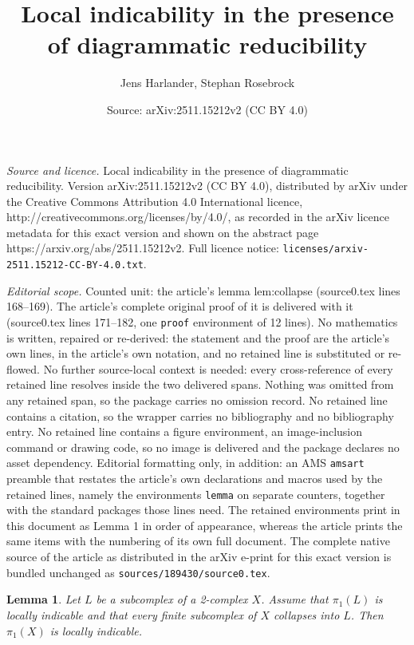 \documentclass[10pt,a4paper]{amsart}
\title{Local indicability in the presence of diagrammatic reducibility}
\author{Jens Harlander, Stephan Rosebrock}
\date{Source: arXiv:2511.15212v2 (CC BY 4.0)}
\newtheorem{lemma}{Lemma}
\begin{document}
\maketitle

\noindent\emph{Source and licence.} Local indicability in the presence of diagrammatic reducibility. Version arXiv:2511.15212v2 (CC BY 4.0), distributed by arXiv under the Creative Commons Attribution 4.0 International licence, http://creativecommons.org/licenses/by/4.0/, as recorded in the arXiv licence metadata for this exact version and shown on the abstract page https://arxiv.org/abs/2511.15212v2. Full licence notice: \texttt{licenses/arxiv-2511.15212-CC-BY-4.0.txt}.\par\smallskip

\noindent\textit{Editorial scope.} Counted unit: the article's lemma lem:collapse (source0.tex lines 168--169). The article's complete original proof of it is delivered with it (source0.tex lines 171--182, one \texttt{proof} environment of 12 lines). No mathematics is written, repaired or re-derived: the statement and the proof are the article's own lines, in the article's own notation, and no retained line is substituted or re-flowed.  No further source-local context is needed: every cross-reference of every retained line resolves inside the two delivered spans.  Nothing was omitted from any retained span, so the package carries no omission record.  No retained line contains a citation, so the wrapper carries no bibliography and no bibliography entry.  No retained line contains a figure environment, an image-inclusion command or drawing code, so no image is delivered and the package declares no asset dependency.  Editorial formatting only, in addition: an AMS \texttt{amsart} preamble that restates the article's own declarations and macros used by the retained lines, namely the environments \texttt{lemma} on separate counters, together with the standard packages those lines need.  The retained environments print in this document as Lemma 1 in order of appearance, whereas the article prints the same items with the numbering of its own full document.  The complete native source of the article as distributed in the arXiv e-print for this exact version is bundled unchanged as \texttt{sources/189430/source0.tex}.
\begin{lemma}\label{lem:collapse} Let $L$ be a subcomplex of a 2-complex $X$. Assume that $\pi_1(L)$ is locally indicable and that every finite subcomplex of $X$ collapses into $L$. Then $\pi_1(X)$ is locally indicable.
\end{lemma}
\end{document}

